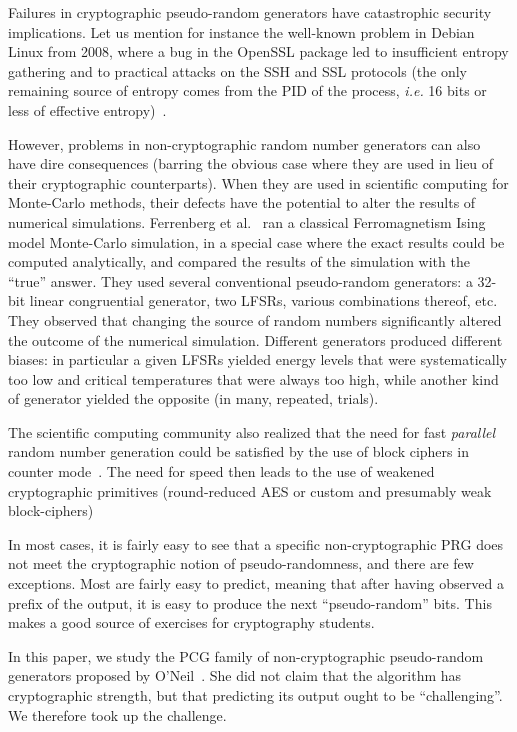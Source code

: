 \documentclass[submission,svgnames,journal=tosc]{iacrtrans}
\begin{document}
Failures in cryptographic pseudo-random generators have catastrophic security
implications. Let us mention for instance the well-known problem in Debian
Linux from 2008, where a bug in the OpenSSL package led to insufficient
entropy gathering and to practical attacks on the SSH and SSL protocols (the
only remaining source of entropy comes from the PID of the process,
\textit{i.e.} 16 bits or less of effective entropy)~\cite{YilekRSES09}.

However, problems in non-cryptographic random number generators can also have
dire consequences (barring the obvious case where they are used in lieu of their
cryptographic counterparts). When they are used in scientific computing for
Monte-Carlo methods, their defects have the potential to alter the results of
numerical simulations. Ferrenberg et al.~\cite{Ferrenberg92} ran a classical
Ferromagnetism Ising model Monte-Carlo simulation, in a special case where the
exact results could be computed analytically, and compared the results of the
simulation with the ``true'' answer. They used several conventional
pseudo-random generators: a 32-bit linear congruential generator, two LFSRs,
various combinations thereof, etc. They observed that changing the source of
random numbers significantly altered the outcome of the numerical
simulation. Different generators produced different biases: in particular a
given LFSRs yielded energy levels that were systematically too low and critical
temperatures that were always too high, while another kind of generator yielded
the opposite (in many, repeated, trials).

The scientific computing community also realized that the need for fast
\emph{parallel} random number generation could be satisfied by the use of block
ciphers in counter mode~\cite{Salmon11}. The need for speed then leads to the
use of weakened cryptographic primitives (round-reduced AES or custom and
presumably weak block-ciphers)

In most cases, it is fairly easy to see that a specific non-cryptographic PRG
does not meet the cryptographic notion of pseudo-randomness, and there are few
exceptions. Most are fairly easy to predict, meaning that after having observed
a prefix of the output, it is easy to produce the next ``pseudo-random''
bits. This makes a good source of exercises for cryptography students.

In this paper, we study the \textsf{PCG} family of non-cryptographic
pseudo-random generators proposed by O'Neil~\cite{melissapaper,melissaweb}. She
did not claim that the algorithm has cryptographic strength, but that predicting
its output ought to be ``challenging''. We therefore took up the challenge.
\end{document}
